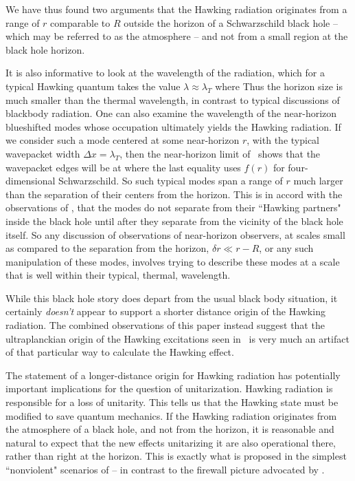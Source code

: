We have thus found two arguments that the Hawking radiation originates from a range of $r$ comparable to $R$ outside the horizon of a Schwarzschild black hole -- which may be referred to as the atmosphere --  and not from a small region at the black hole horizon.


It is also informative to look at the wavelength of the radiation, which for a typical Hawking quantum takes the value $\lambda\approx \lambda_T$ where
%
\eqn{}
%
Thus the horizon size is much smaller than the thermal wavelength, in contrast to typical discussions of blackbody radiation.  
One can also examine the wavelength of the near-horizon blueshifted modes whose occupation ultimately yields the Hawking radiation.  If we consider such a mode centered at some near-horizon $r$, with the typical wavepacket width $\Delta x=\lambda_T$, then the near-horizon limit of \tortdef\ shows that the wavepacket edges will be at 
%
\eqn{}
%
where the last equality uses $f(r)$ for four-dimensional Schwarzschild.  
So such typical modes span a range of $r$ much larger than the separation of their centers from the horizon.  This is in accord with the observations of \GiddingsBE, that the modes do not separate from their ``Hawking partners" inside the black hole until after they separate from the vicinity of the black hole itself.
So any discussion of observations of near-horizon observers, at scales small as compared to the separation from the horizon, $\delta r\ll r-R$, or any such manipulation of these modes\AMPS, involves trying to describe these modes at a scale that is well within their typical, thermal, wavelength.   

While this black hole story does depart from the usual black body situation, it certainly {\it doesn't} appear to support a shorter distance origin of the Hawking radiation.  The combined observations of this paper instead suggest that the ultraplanckian origin of the Hawking excitations seen in \Hawk\ is very much an artifact of that particular way to calculate the Hawking effect.


The statement of a longer-distance origin for Hawking radiation has potentially important implications for the question of unitarization.  Hawking radiation is responsible for a loss of unitarity.  This tells us that the Hawking state must be modified to save quantum mechanics.  If the Hawking radiation originates from the atmosphere of a black hole, and not from the horizon, it is reasonable and natural to expect that the new effects unitarizing it are also operational there, rather than right at the horizon.  This is exactly what is proposed in the simplest ``nonviolent" scenarios of  -- in contrast to the firewall picture advocated by .  


